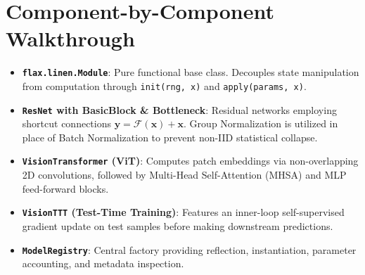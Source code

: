 \documentclass[11pt,a4paper,titlepage]{report}
\begin{document}
\section{Component-by-Component Walkthrough}
\begin{itemize}[leftmargin=*]
    \item \textbf{\texttt{flax.linen.Module}}: Pure functional base class. Decouples state manipulation from computation through \texttt{init(rng, x)} and \texttt{apply(params, x)}.
    \item \textbf{\texttt{ResNet} with BasicBlock \& Bottleneck}: Residual networks employing shortcut connections $\mathbf{y} = \mathcal{F}(\mathbf{x}) + \mathbf{x}$. Group Normalization is utilized in place of Batch Normalization to prevent non-IID statistical collapse.
    \item \textbf{\texttt{VisionTransformer} (ViT)}: Computes patch embeddings via non-overlapping 2D convolutions, followed by Multi-Head Self-Attention (MHSA) and MLP feed-forward blocks.
    \item \textbf{\texttt{VisionTTT} (Test-Time Training)}: Features an inner-loop self-supervised gradient update on test samples before making downstream predictions.
    \item \textbf{\texttt{ModelRegistry}}: Central factory providing reflection, instantiation, parameter accounting, and metadata inspection.
\end{itemize}
\end{document}
